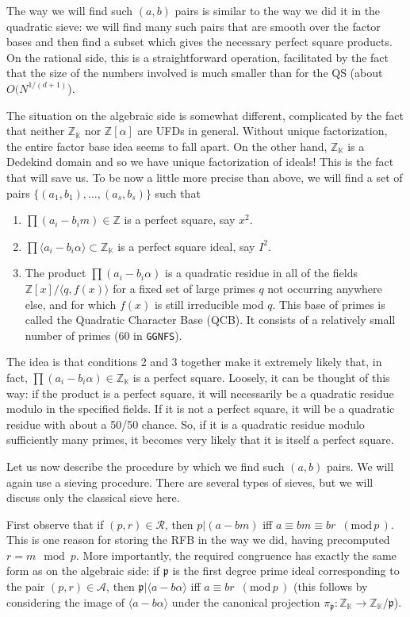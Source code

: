 \documentclass[12pt]{article}
\newcommand{\K}{\mathbb{K}}
\newcommand{\Z}{\mathbb{Z}}
\newcommand{\rfb}{\mathcal{R}}
\newcommand{\afb}{\mathcal{A}}
\newcommand{\p}{\mathfrak{p}}
\newcommand{\md}[1]{\,\,\, ( \mathrm{mod}\, #1 \,) }
\newcommand{\ideal}[1]{{\langle #1 \rangle}}
\begin{document}
  The way we will find such $(a,b)$ pairs is similar to the way we
  did it in the quadratic sieve: we will find many such pairs that
  are smooth over the factor bases and then find a subset which 
  gives the necessary perfect square products. On the rational
  side, this is a straightforward operation, facilitated by the
  fact that the size of the numbers involved is much smaller than
  for the QS (about $O(N^{1/(d+1)}$).

  The situation on the algebraic side is somewhat different, complicated
  by the fact that neither $\Z_\K$ nor $\Z[\alpha]$ are UFDs
  in general. Without unique factorization, the entire factor base
  idea seems to fall apart. On the other hand, $\Z_\K$ is a 
  Dedekind domain and so we have unique factorization of ideals!
  This is the fact that will save us. To be now a little more precise
  than above, we will find a set of pairs  $\{(a_1, b_1),\ldots ,(a_s, b_s)\}$
  such that
  \begin{enumerate}
    \item
      $\prod(a_i - b_im)\in\Z$ is a perfect square, say $x^2$.
    \item
      $\prod\ideal{a_i - b_i\alpha}\subset\Z_\K$ is a perfect square ideal, 
      say $I^2$.
    \item
      The product $\prod(a_i-b_i\alpha)$ is a quadratic residue 
      in all of the fields $\Z[x]/\ideal{q, f(x)}$
      for a fixed set of large primes $q$ not occurring anywhere
      else, and for which $f(x)$ is still irreducible mod $q$.
      This base of primes is called the Quadratic Character
      Base (QCB). It consists of a relatively small number of 
      primes (60 in {\tt GGNFS}).
  \end{enumerate}
  The idea is that conditions 2 and 3 together make it extremely
  likely that, in fact, 
  $\prod(a_i - b_i\alpha)\in\Z_\K$ is a perfect square.
  Loosely, it can be thought of this way: if the product is a perfect
  square, it will necessarily be a quadratic residue modulo
  in the specified fields. If it is not a perfect square, it
  will be a quadratic residue with about a 50/50 chance. So, if
  it is a quadratic residue modulo sufficiently many primes, it
  becomes very likely that it is itself a perfect square.

  Let us now describe the procedure by which we find such $(a,b)$
  pairs. We will again use a sieving procedure. There are several
  types of sieves, but we will discuss only the classical sieve
  here.

  First observe that if $(p,r)\in\rfb$, then $p\vert (a-bm)$ iff
  $a\equiv bm \equiv br \md{p}$. This is one reason for storing the RFB
  in the way we did, having precomputed $r=m\mod p$. More importantly,
  the required congruence has exactly the same form as on the
  algebraic side: if $\p$ is the first degree prime ideal corresponding
  to the pair $(p,r)\in\afb$, then $\p \vert \ideal{a-b\alpha}$
  iff $a\equiv br\md{p}$ (this follows by considering the image
  of $\ideal{a-b\alpha}$ under the canonical projection
  $\pi_\p : \Z_\K \longrightarrow \Z_\K/\p$).
\end{document}
